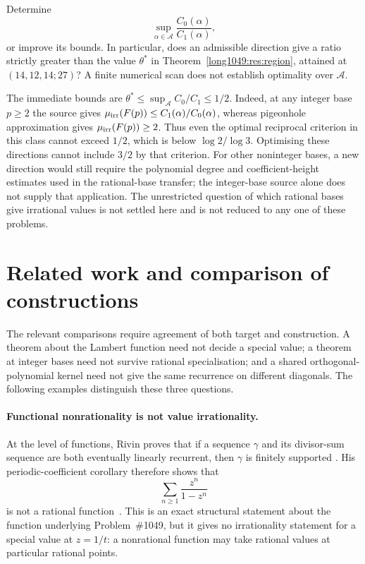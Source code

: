 \begin{problem}
Determine
\[
 \sup_{\alpha\in\mathcal A}\frac{C_0(\alpha)}{C_1(\alpha)},
\]
or improve its bounds. In particular, does an admissible direction give
a ratio strictly greater than the value $\theta^*$ in
Theorem~\ref{long1049:res:region}, attained at $(14,12,14;27)$?
A finite numerical scan does not establish optimality over $\mathcal A$.
\end{problem}

The immediate bounds are $\theta^*\le\sup_{\mathcal A}C_0/C_1\le1/2$.
Indeed, at any integer base $p\ge2$ the source gives
$\mu_{\rm irr}(F(p))\le C_1(\alpha)/C_0(\alpha)$, whereas pigeonhole
approximation gives $\mu_{\rm irr}(F(p))\ge2$.
Thus even the optimal reciprocal criterion in this class cannot exceed
$1/2$, which is below $\log2/\log3$. Optimising these directions cannot
include $3/2$ by that criterion. For other noninteger bases, a new
direction would still require the polynomial degree and coefficient-height
estimates used in the rational-base transfer; the integer-base source
alone does not supply that application.
The unrestricted question of which rational bases give irrational values
is not settled here and is not reduced to any one of these problems.

\section*{Related work and comparison of constructions}
The relevant comparisons require agreement of both target and
construction. A theorem about the Lambert function need not decide
a special value; a theorem at integer bases need not survive
rational specialisation; and a shared orthogonal-polynomial kernel
need not give the same recurrence on different diagonals.
The following examples distinguish these three questions.

\paragraph{Functional nonrationality is not value irrationality.}
At the level of functions, Rivin proves that if a sequence \(\gamma\) and its
divisor-sum sequence are both eventually linearly recurrent, then \(\gamma\)
is finitely supported
\cite[Theorem~1.1, p.~2; proof pp.~6--7]{rivin2026}.
His periodic-coefficient corollary therefore shows that
\[
  \sum_{n\ge1}\frac{z^n}{1-z^n}
\]
is not a rational function~\cite[Corollary~6.4, p.~9]{rivin2026}.
This is an exact structural statement about the function underlying
Problem~\#1049, but it gives no irrationality statement for a special value
at \(z=1/t\): a nonrational function may take rational values at particular
rational points.

